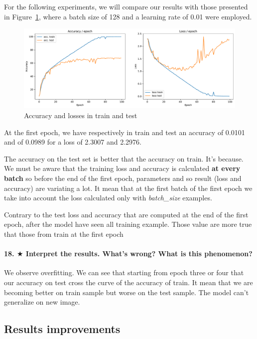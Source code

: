 \documentclass{article}
\theoremstyle{plain}%
\theoremstyle{definition}
\theoremstyle{remark}
\begin{document}
For the following experiments, we will compare our results with those presented in Figure~\ref{fig:base_result}, where a batch size of 128 and a learning rate of 0.01 were employed.

\begin{figure}[H]
    \centering
    \includegraphics*[width=\textwidth]{figs/CNN/base_result.pdf}
    \caption{Accuracy and losses in train and test}
    \label{fig:base_result}
\end{figure}

At the first epoch, we have respectively in train and test an accuracy of 0.0101 and of 0.0989 for a loss of 2.3007 and 2.2976. 

The accuracy on the test set is better that the accuracy on train. It's because.
We must be aware that the training loss and accuracy is calculated \textbf{at every batch} so before the end of the first epoch, parameters and so result (loss and accuracy) are variating a lot. It mean that at the first batch of the first epoch we take into account the loss calculated only with \textit{batch\_size} examples.

Contrary to the test loss and accuracy that are computed at the end of the first epoch, after the model have seen all training example. Those value are more true that those from train at the first epoch %

\paragraph{18. $ \bigstar $ Interpret the results. What's wrong? What is this phenomenon?}
We observe overfitting. We can see that starting from epoch three or four that our accuracy on test cross the curve of the accuracy of train. It mean that we are becoming better on train sample but worse on the test sample. The model can't generalize on new image.


\subsection{Results improvements}
\end{document}
